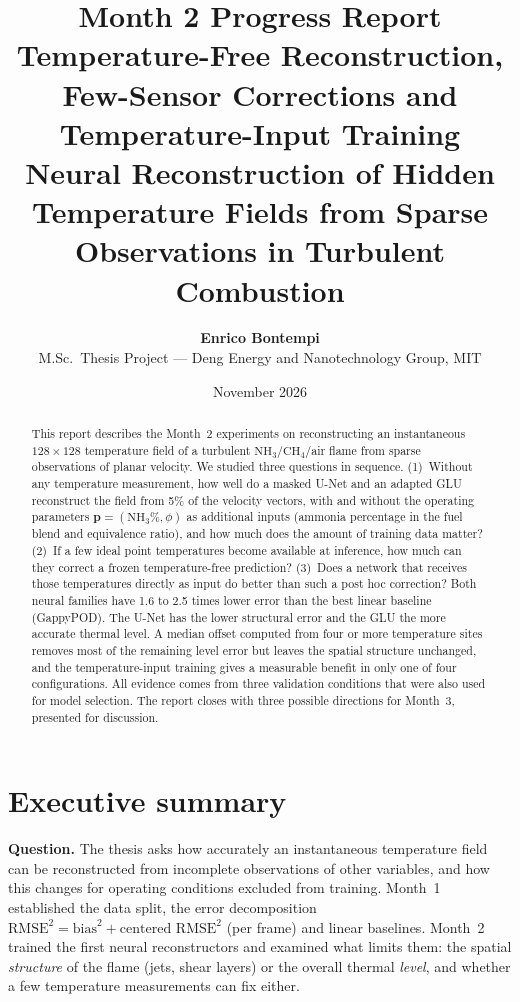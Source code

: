 \documentclass[11pt,letterpaper]{article}
\title{\textbf{Month 2 Progress Report}\\[0.3em]
\large Temperature-Free Reconstruction, Few-Sensor Corrections and Temperature-Input Training\\[0.5em]
\normalsize Neural Reconstruction of Hidden Temperature Fields from Sparse Observations in Turbulent Combustion}
\author{\textbf{Enrico Bontempi}\\
M.Sc.\ Thesis Project --- Deng Energy and Nanotechnology Group, MIT}
\date{November 2026}
\newcommand{\NH}{\text{NH}_3}
\begin{document}
\maketitle

\begin{abstract}
\noindent
This report describes the Month~2 experiments on reconstructing an instantaneous $128\times128$ temperature field of a turbulent $\NH/\text{CH}_4$/air flame from sparse observations of planar velocity. We studied three questions in sequence. (1)~Without any temperature measurement, how well do a masked U-Net and an adapted GLU reconstruct the field from 5\% of the velocity vectors, with and without the operating parameters $\mathbf{p}=(\NH\%,\phi)$ as additional inputs (ammonia percentage in the fuel blend and equivalence ratio), and how much does the amount of training data matter? (2)~If a few ideal point temperatures become available at inference, how much can they correct a frozen temperature-free prediction? (3)~Does a network that receives those temperatures directly as input do better than such a post hoc correction? Both neural families have 1.6 to 2.5 times lower error than the best linear baseline (GappyPOD). The U-Net has the lower structural error and the GLU the more accurate thermal level. A median offset computed from four or more temperature sites removes most of the remaining level error but leaves the spatial structure unchanged, and the temperature-input training gives a measurable benefit in only one of four configurations. All evidence comes from three validation conditions that were also used for model selection. The report closes with three possible directions for Month~3, presented for discussion.
\end{abstract}

\clearpage
{\setcounter{tocdepth}{1}\tableofcontents}
\bigskip

\section{Executive summary}
\label{sec:summary}

\textbf{Question.} The thesis asks how accurately an instantaneous temperature field can be reconstructed from incomplete observations of other variables, and how this changes for operating conditions excluded from training. Month~1 established the data split, the error decomposition $\text{RMSE}^2=\text{bias}^2+\text{centered RMSE}^2$ (per frame) and linear baselines. Month~2 trained the first neural reconstructors and examined what limits them: the spatial \emph{structure} of the flame (jets, shear layers) or the overall thermal \emph{level}, and whether a few temperature measurements can fix either.
\end{document}
